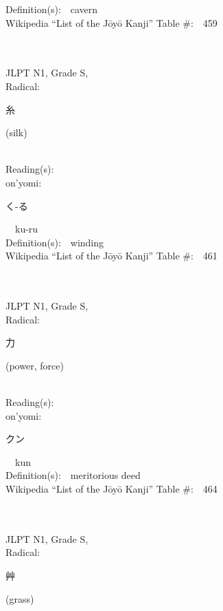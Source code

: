 \begin{multicols}{2}
Definition(s):\ \ cavern \\
Wikipedia ``List of the J\=oy\=o Kanji'' Table \#:\ \ 459 \\
\ \ \\
{\fontsize{34pt}{40pt}  }\ \ \\
{JLPT N1, Grade S, \\Radical:\ \ {\begin{CJK}{UTF8}{min} 糸 \end{CJK}} (silk) } \\
Reading(s):\ \ \\
{\hspace*{1em}}on'yomi:\ \ \\
{\hspace*{2em}}{\begin{CJK}{UTF8}{min} く-る \end{CJK}}\ \ ku-ru\ \ \\
Definition(s):\ \ winding \\
Wikipedia ``List of the J\=oy\=o Kanji'' Table \#:\ \ 461 \\
\ \ \\
{\fontsize{34pt}{40pt}  }\ \ \\
{JLPT N1, Grade S, \\Radical:\ \ {\begin{CJK}{UTF8}{min} 力 \end{CJK}} (power, force) } \\
Reading(s):\ \ \\
{\hspace*{1em}}on'yomi:\ \ \\
{\hspace*{2em}}{\begin{CJK}{UTF8}{min} クン \end{CJK}}\ \ kun\ \ \\
Definition(s):\ \ meritorious deed \\
Wikipedia ``List of the J\=oy\=o Kanji'' Table \#:\ \ 464 \\
\ \ \\
{\fontsize{34pt}{40pt}  }\ \ \\
{JLPT N1, Grade S, \\Radical:\ \ {\begin{CJK}{UTF8}{min} 艸 \end{CJK}} (grass) } \\

\end{multicols}
